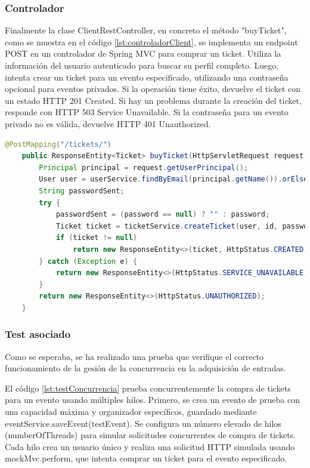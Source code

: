 \subsubsection{Controlador}
Finalmente la clase ClientRestController, en concreto el método "buyTicket", como se muestra en el código \ref{lst:controladorClient}, se implementa un endpoint POST en un controlador de Spring MVC
para comprar un ticket. Utiliza la información del usuario autenticado para buscar su perfil completo. Luego, intenta crear un ticket para un evento especificado, utilizando
una contraseña opcional para eventos privados. Si la operación tiene éxito, devuelve el ticket con un estado HTTP 201 Created. Si hay un problema durante la creación del
ticket, responde con HTTP 503 Service Unavailable. Si la contraseña para un evento privado no es válida, devuelve HTTP 401 Unauthorized.
\myjavastyle
\begin{lstlisting}[language=Java, caption=Función buyTicket, label=lst:controladorClient]
    @PostMapping("/tickets/")
    public ResponseEntity<Ticket> buyTicket(HttpServletRequest request, @RequestParam Long id, @RequestBody(required = false) String password) {
        Principal principal = request.getUserPrincipal();
        User user = userService.findByEmail(principal.getName()).orElseThrow();
        String passwordSent;
        try {
            passwordSent = (password == null) ? "" : password;
            Ticket ticket = ticketService.createTicket(user, id, passwordSent);
            if (ticket != null)
                return new ResponseEntity<>(ticket, HttpStatus.CREATED);
        } catch (Exception e) {
            return new ResponseEntity<>(HttpStatus.SERVICE_UNAVAILABLE);
        }
        return new ResponseEntity<>(HttpStatus.UNAUTHORIZED);
    }
\end{lstlisting}

\subsubsection{Test asociado}
Como se esperaba, se ha realizado una prueba que verifique el correcto funcionamiento de la gesión de la concurrencia en la adquisición de entradas. 

El código \ref{lst:testConcurrencia} prueba concurrentemente la compra de tickets para un evento usando múltiples hilos. Primero, se crea un evento de prueba con una capacidad máxima y organizador
específicos, guardado mediante eventService.saveEvent(testEvent). Se configura un número elevado de hilos (numberOfThreads) para simular solicitudes concurrentes de compra
de tickets. Cada hilo crea un usuario único y realiza una solicitud HTTP simulada usando mockMvc.perform, que intenta comprar un ticket para el evento especificado.

